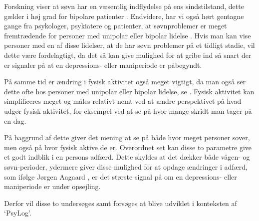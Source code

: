 Forskning viser at søvn har en væsentlig indflydelse på ens sindstilstand, dette gælder i høj grad for bipolare patienter \citep{CPSP:CPSP1164}.
Endvidere, har vi også hørt gentagne gange fra psykologer, psykiatere og patienter, at søvnproblemer er meget fremtrædende for personer med unipolar eller bipolar lidelse \citep[Kapitel 1, Sektion 3,4,5]{misc:faellesrapp}.
Hvis man kan vise personer med en af disse lidelser, at de har søvn problemer på et tidligt stadie, vil dette være fordelagtigt, da det så kan give mulighed for at gribe ind så snart der er signaler på at en depressions- eller maniperiode er påbegyndt.

På samme tid er ændring i fysisk aktivitet også meget vigtigt, da man også ser dette ofte hos personer med unipolar eller bipolar lidelse, se \citep[Kapitel 1, Sektion 4]{misc:faellesrapp}. 
Fysisk aktivitet kan simplificeres meget og måles relativt nemt ved at ændre perspektivet på hvad udgør fysisk aktivitet, for eksempel ved at se på hvor mange skridt man tager på en dag.

På baggrund af dette giver det mening at se på både hvor meget personer sover, men også på hvor fysisk aktive de er.
Overordnet set kan disse to parametre give et godt indblik i en persons adfærd.
Dette skyldes at det dækker både vågen- og søvn-perioder, ydermere giver disse mulighed for at opdage ændringer i adfærd, som ifølge Jørgen Aagaard \citep[Kapitel 1, Sektion 4]{misc:faellesrapp}, er det største signal på om en depressions- eller maniperiode er under opsejling. 

Derfor vil disse to undersøges samt forsøges at blive udviklet i konteksten af `PsyLog'.